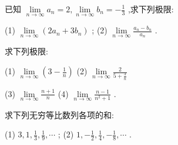 \documentclass[lang=cn,newtx,12pt,scheme=chinese]{elegantbook}
\begin{document}
\begin{problemset}[练习]
\item 已知 \(\mathop{\lim }\limits_{{n \rightarrow \infty }}{a}_{n} = 2,\mathop{\lim }\limits_{{n \rightarrow \infty }}{b}_{n} = - \frac{1}{3}\) ,求下列极限:

(1) \(\mathop{\lim }\limits_{{n \rightarrow \infty }}\left( {2{a}_{n} + 3{b}_{n}}\right)\) ; (2) \(\mathop{\lim }\limits_{{n \rightarrow \infty }}\frac{{a}_{n} - {b}_{n}}{{a}_{n}}\) .

\item 求下列极限:

(1) \(\mathop{\lim }\limits_{{n \rightarrow \infty }}\left( {3 - \frac{1}{n}}\right)\) (2) \(\mathop{\lim }\limits_{{n \rightarrow \infty }}\frac{2}{5 + \frac{3}{n}}\)

(3) \(\mathop{\lim }\limits_{{n \rightarrow \infty }}\frac{n + 1}{n}\) (4) \(\mathop{\lim }\limits_{{n \rightarrow \infty }}\frac{n - 1}{{n}^{2} + 1}\) .

\item 求下列无穷等比数列各项的和:

(1) \(3,1,\frac{1}{3},\frac{1}{9},\cdots\) ; (2) \(1, - \frac{1}{2},\frac{1}{4}, - \frac{1}{8},\cdots\) .

\end{problemset}
\end{document}
